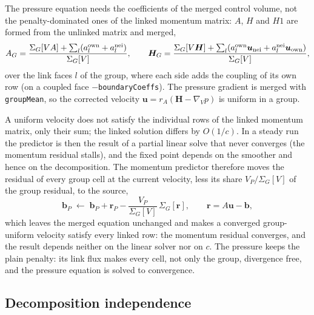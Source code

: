 \documentclass[11pt,a4paper]{article}
\theoremstyle{remark}
\newcommand{\uu}{\bm{u}}
\newcommand{\code}[1]{\texttt{#1}}
\newcommand{\gradV}{\nabla_{\!V}}
\begin{document}
The pressure equation needs the coefficients of the merged control volume, not the
penalty-dominated ones of the linked momentum matrix: $A$, $H$ and $H1$ are formed from the
unlinked matrix and merged,
\begin{equation}
A_G=\frac{\Sigma_G[V A]+\sum_{l}(a^{\rm own}_l+a^{\rm nei}_l)}{\Sigma_G[V]},\qquad
\bm H_G=\frac{\Sigma_G[V\bm H]+\sum_{l}(a^{\rm own}_l\uu_{\rm nei}+a^{\rm nei}_l\uu_{\rm own})}{\Sigma_G[V]},
\end{equation}
over the link faces $l$ of the group, where each side adds the coupling of its own row (on a
coupled face $-$\code{boundaryCoeffs}). The pressure gradient is merged with \code{groupMean},
so the corrected velocity $\uu=r_A(\bm H-\gradV p)$ is uniform in a group.

A uniform velocity does not satisfy the individual rows of the linked momentum matrix, only
their sum; the linked solution differs by $O(1/c)$. In a steady run the predictor is then the
result of a partial linear solve that never converges (the momentum residual stalls), and the
fixed point depends on the smoother and hence on the decomposition. The momentum predictor
therefore moves the residual of every group cell at the current velocity, less its share
$V_P/\Sigma_G[V]$ of the group residual, to the source,
\begin{equation}
\bm b_P\;\leftarrow\;\bm b_P+\bm r_P-\frac{V_P}{\Sigma_G[V]}\,\Sigma_G[\bm r],\qquad
\bm r=A\uu-\bm b ,
\end{equation}
which leaves the merged equation unchanged and makes a converged group-uniform velocity satisfy
every linked row: the momentum residual converges, and the result depends neither on the
linear solver nor on $c$. The pressure keeps the plain penalty: its link flux makes every cell,
not only the group, divergence free, and the pressure equation is solved to convergence.

\subsection{Decomposition independence}
\label{sec:decomp}
\end{document}
